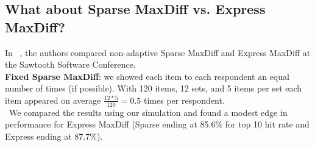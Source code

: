 \documentclass[nonblindrev]{informs3}
\begin{document}


\subsection{What about Sparse MaxDiff vs. Express MaxDiff?}
In ~\cite{wirth2012largeset}, the authors compared non-adaptive Sparse MaxDiff and Express MaxDiff at the Sawtooth Software Conference.\\
\textbf{Fixed Sparse MaxDiff}: we showed each item to each respondent an equal number of times (if possible).  With 120 items, 12 sets, and 5 items per set each item appeared on average $\frac{12*5}{120} = 0.5$ times per respondent. \\
 We compared the results using our simulation and found a modest edge in performance for Express MaxDiff (Sparse ending at 85.6\% for top 10 hit rate and Express ending at 87.7\%).
\end{document}
